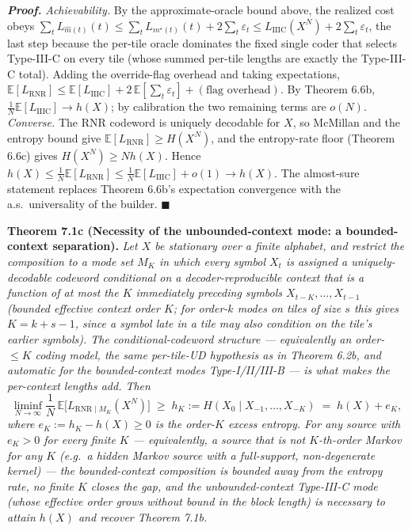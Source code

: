 \documentclass[
]{article}
\begin{document}
\emph{\textbf{Proof.}} \emph{Achievability.} By the approximate-oracle
bound above, the realized cost obeys $\sum_t L_{\hat m(t)}(t) \le
\sum_t L_{m^\star(t)}(t) + 2\sum_t \varepsilon_t \le
L_{\mathrm{IIIC}}(X^N) + 2\sum_t \varepsilon_t$, the last step because
the per-tile oracle dominates the fixed single coder that selects
Type-III-C on every tile (whose summed per-tile lengths are exactly the
Type-III-C total). Adding the override-flag overhead and taking
expectations, $\mathbb{E}[L_{\mathrm{RNR}}] \le \mathbb{E}[L_{\mathrm{IIIC}}]
+ 2\,\mathbb{E}[\sum_t \varepsilon_t] + (\text{flag overhead})$. By
Theorem 6.6b, $\tfrac1N \mathbb{E}[L_{\mathrm{IIIC}}] \to h(X)$; by
calibration the two remaining terms are $o(N)$. \emph{Converse.} The RNR
codeword is uniquely decodable for $X$, so McMillan and the entropy
bound give $\mathbb{E}[L_{\mathrm{RNR}}] \ge H(X^N)$, and the
entropy-rate floor (Theorem 6.6c) gives $H(X^N) \ge N h(X)$. Hence
$h(X) \le \tfrac1N \mathbb{E}[L_{\mathrm{RNR}}] \le \tfrac1N
\mathbb{E}[L_{\mathrm{IIIC}}] + o(1) \to h(X)$. The almost-sure statement
replaces Theorem 6.6b's expectation convergence with the a.s.\
universality of the builder. \hfill$\blacksquare$

\textbf{Theorem 7.1c (Necessity of the unbounded-context mode: a
bounded-context separation).} \emph{Let $X$ be stationary over a finite
alphabet, and restrict the composition to a mode set $M_K$ in which every
symbol $X_t$ is assigned a uniquely-decodable codeword conditional on a
decoder-reproducible context that is a function of at most the $K$
immediately preceding symbols $X_{t-K},\ldots,X_{t-1}$ (bounded effective
context order $K$; for order-$k$ modes on tiles of size $s$ this gives
$K = k + s - 1$, since a symbol late in a tile may also condition on the
tile's earlier symbols). The conditional-codeword structure --- equivalently
an order-$\le\!K$ coding model, the same per-tile-UD hypothesis as in
Theorem 6.2b, and automatic for the bounded-context modes
Type-I/II/III-B --- is what makes the per-context lengths add. Then}
\[
\liminf_{N\to\infty} \frac1N \, \mathbb{E}\bigl[L_{\mathrm{RNR}\mid M_K}(X^N)\bigr]
\;\ge\; h_K := H(X_0 \mid X_{-1},\ldots,X_{-K}) \;=\; h(X) + e_K,
\]
\emph{where $e_K := h_K - h(X) \ge 0$ is the order-$K$ excess entropy. For
any source with $e_K > 0$ for every finite $K$ --- equivalently, a source
that is not $K$-th-order Markov for any $K$ (e.g.\ a hidden Markov source
with a full-support, non-degenerate kernel) --- the bounded-context
composition is bounded away from the entropy rate, no finite $K$ closes
the gap, and the unbounded-context Type-III-C mode (whose effective order
grows without bound in the block length) is necessary to attain $h(X)$
and recover Theorem 7.1b.}
\end{document}
